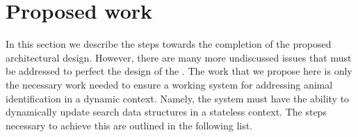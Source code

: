 \section{Proposed work}\label{sec:systempropose}
    In this section we describe the steps towards the completion of the
      proposed architectural design.
    However, there are many more undiscussed issues that must be addressed to
      perfect the design of the \depcache{}.
    The work that we propose here is only the necessary work needed to ensure
      a working system for addressing animal identification in a dynamic
      context.
    Namely, the system must have the ability to dynamically update search data
      structures in a stateless context.
    The steps necessary to achieve this are outlined in the following list.


